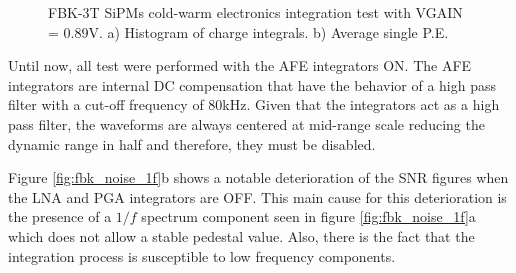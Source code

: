 \begin{figure}[h]
\centering
{}
\caption[]{FBK-3T SiPMs cold-warm electronics integration test with VGAIN = 0.89V.  a) Histogram of charge integrals. b) Average single P.E.}
\label{fig:fbk_hist_avg_vgain_2000}
\end{figure}

Until now, all test were performed with the AFE integrators ON. The AFE integrators are internal DC compensation that have the behavior of a high pass filter with a cut-off frequency of 80kHz. Given that the integrators act as a high pass filter, the waveforms are always centered at mid-range scale reducing the dynamic range in half and therefore, they must be disabled.

Figure \ref{fig:fbk_noise_1f}b shows a notable deterioration of the SNR figures when the LNA and PGA integrators are OFF. This main cause for this deterioration is the presence of a $1/f$ spectrum component seen in figure \ref{fig:fbk_noise_1f}a which does not allow a stable pedestal value. Also, there is the fact that the integration process is susceptible to low frequency components. 

